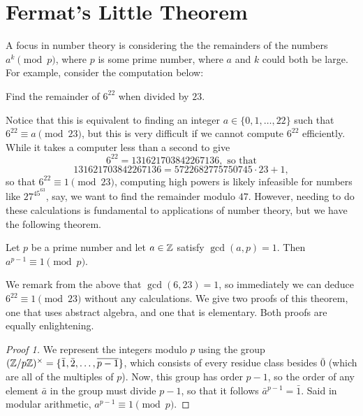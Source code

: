 \documentclass{article}
\begin{document}
\setcounter{section}{49}
\section{Fermat's Little Theorem}
A focus in number theory is considering the the remainders of the numbers $a^k\pmod p$, where $p$ is some prime number, where $a$ and $k$ could both be large. For example, consider the computation below:
\begin{example}
Find the remainder of $6^{22}$ when divided by $23$. 
\end{example}
Notice that this is equivalent to finding an integer $a\in \{0, 1, \ldots, 22\}$ such that $6^{22} \equiv a\pmod{23}$, but this is very difficult if we cannot compute $6^{22}$ efficiently. While it takes a computer less than a second to give
$$6^{22} = 131621703842267136, \text{ so that}$$
$$131621703842267136 = 5722682775750745 \cdot 23 + 1,$$
so that $6^{22}\equiv 1\pmod{23}$, computing high powers is likely infeasible for numbers like $27^{45^{63}}$, say, we want to find the remainder modulo $47$. However, needing to do these calculations is fundamental to applications of number theory, but we have the following theorem.
\begin{theorem}
Let $p$ be a prime number and let $a\in \mathbb Z$ satisfy $\gcd(a,p) = 1$. Then $a^{p-1}\equiv 1\pmod p$.
\end{theorem}

We remark from the above that $\gcd(6, 23) = 1$, so immediately we can deduce $6^{22}\equiv 1\pmod{23}$ without any calculations. We give two proofs of this theorem, one that uses abstract algebra, and one that is elementary. Both proofs are equally enlightening.
\begin{proof}[Proof 1]
We represent the integers modulo $p$ using the group $(\mathbb Z/p\mathbb Z)^\times = \{\bar 1, \bar 2, \ldots, \overline{p-1}\}$, which consists of every residue class besides $\bar 0$ (which are all of the multiples of $p$). Now, this group has order $p-1$, so the order of any element $\bar a$ in the group must divide $p-1$, so that it follows $\bar a^{p-1} = \bar 1$. Said in modular arithmetic, $a^{p-1}\equiv 1\pmod p$.
\end{proof}
\end{document}
